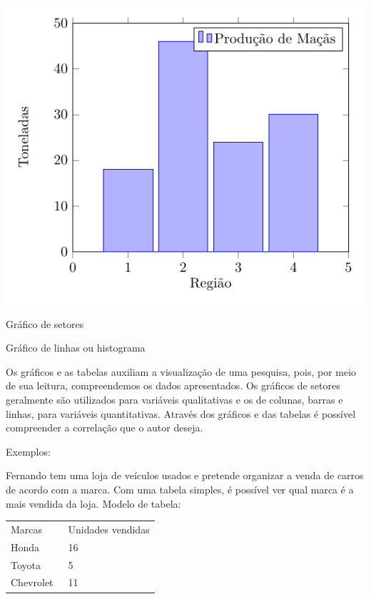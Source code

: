 {\medskip\hfill\includegraphics[width=.6\textwidth]{./tikz/columnchart.pdf}\hfill\medskip

Gráfico de setores

Gráfico de linhas ou histograma


Os gráficos e as tabelas auxiliam a visualização de uma pesquisa, pois,
por meio de sua leitura, compreendemos os dados apresentados. Os
gráficos de setores geralmente são utilizados para variáveis
qualitativas e os de colunas, barras e linhas, para variáveis
quantitativas. Através dos gráficos e das tabelas é possível compreender
a correlação que o autor deseja.

\medskip \noindent Exemplos:

Fernando tem uma loja de veículos usados e pretende
organizar a venda de carros de acordo com a marca. Com uma tabela
simples, é possível ver qual marca é a mais vendida da loja. Modelo de
tabela:

\begin{longtable}[]{@{}ll@{}}
\toprule
\endhead
Marcas & Unidades vendidas\tabularnewline
Honda & 16\tabularnewline
Toyota & 5\tabularnewline
Chevrolet~ & 11\tabularnewline
\bottomrule
\end{longtable}



}
